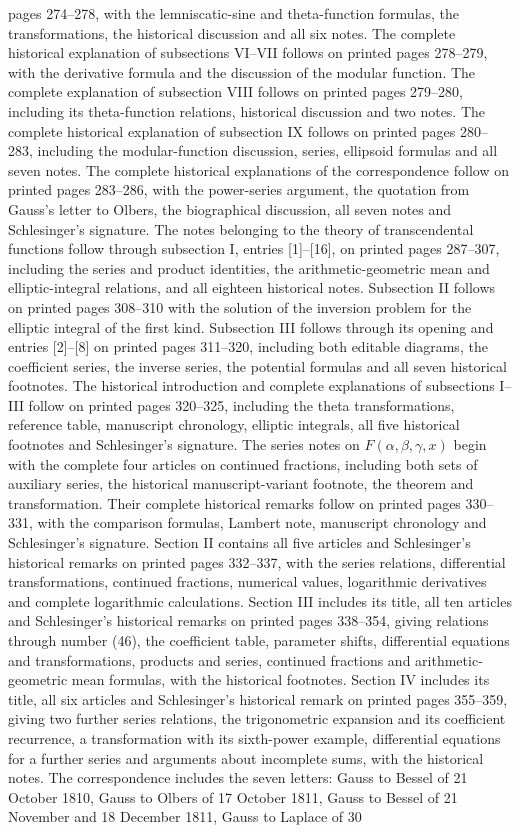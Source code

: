 pages 274–278, with the lemniscatic-sine and theta-function formulas, the transformations, the historical discussion and all six notes. The complete historical explanation of subsections VI–VII follows on printed pages 278–279, with the derivative formula and the discussion of the modular function. The complete explanation of subsection VIII follows on printed pages 279–280, including its theta-function relations, historical discussion and two notes. The complete historical explanation of subsection IX follows on printed pages 280–283, including the modular-function discussion, series, ellipsoid formulas and all seven notes. The complete historical explanations of the correspondence follow on printed pages 283–286, with the power-series argument, the quotation from Gauss’s letter to Olbers, the biographical discussion, all seven notes and Schlesinger’s signature. The notes belonging to the theory of transcendental functions follow through subsection I, entries [1]–[16], on printed pages 287–307, including the series and product identities, the arithmetic-geometric mean and elliptic-integral relations, and all eighteen historical notes. Subsection II follows on printed pages 308–310 with the solution of the inversion problem for the elliptic integral of the first kind. Subsection III follows through its opening and entries [2]–[8] on printed pages 311–320, including both editable diagrams, the coefficient series, the inverse series, the potential formulas and all seven historical footnotes. The historical introduction and complete explanations of subsections I–III follow on printed pages 320–325, including the theta transformations, reference table, manuscript chronology, elliptic integrals, all five historical footnotes and Schlesinger’s signature. The series notes on $F(\alpha,\beta,\gamma,x)$ begin with the complete four articles on continued fractions, including both sets of auxiliary series, the historical manuscript-variant footnote, the theorem and transformation. Their complete historical remarks follow on printed pages 330–331, with the comparison formulas, Lambert note, manuscript chronology and Schlesinger’s signature. Section II contains all five articles and Schlesinger’s historical remarks on printed pages 332–337, with the series relations, differential transformations, continued fractions, numerical values, logarithmic derivatives and complete logarithmic calculations. Section III includes its title, all ten articles and Schlesinger’s historical remarks on printed pages 338–354, giving relations through number (46), the coefficient table, parameter shifts, differential equations and transformations, products and series, continued fractions and arithmetic-geometric mean formulas, with the historical footnotes. Section IV includes its title, all six articles and Schlesinger’s historical remark on printed pages 355–359, giving two further series relations, the trigonometric expansion and its coefficient recurrence, a transformation with its sixth-power example, differential equations for a further series and arguments about incomplete sums, with the historical notes. The correspondence includes the seven letters: Gauss to Bessel of 21 October 1810, Gauss to Olbers of 17 October 1811, Gauss to Bessel of 21 November and 18 December 1811, Gauss to Laplace of 30 